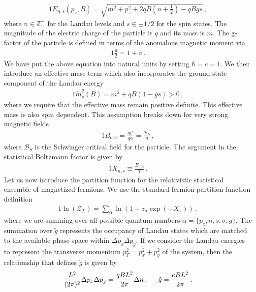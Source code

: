 \documentclass[
aps,
pra,
showpacs,
preprintnumbers,
amsmath,
amssymb,
footinbib
]{revtex4-2}
\begin{document}
\begin{alignat}{1}
    \label{EnergyKGP} E_{n,s}(p_{z},B) = \sqrt{m^{2}+p_{z}^{2}+2qB\left(n+\frac{1}{2}\right)-qBgs}\,,
\end{alignat}
where $n\in\mathbb{Z^{+}}$ for the Landau levels and $s\in\pm1/2$ for the spin states. The magnitude of the electric charge of the particle is $q$ and its mass is $m$. The g-factor of the particle is defined in terms of the anomalous magnetic moment via
\begin{alignat}{1}
    \label{gFactor} \frac{g}{2}=1+a\,.
\end{alignat}
We have put the above equation into natural units by setting $\hbar=c=1$. We then introduce an effective mass term which also incorporates the ground state component of the Landau energy
\begin{alignat}{1}
    \label{EffectiveMass} \tilde{m}^{2}_{s}(B)=m^{2}+qB(1-gs)>0\,,
\end{alignat}
where we require that the effective mass remain positive definite. This effective mass is also spin dependent. This assumption breaks down for very strong magnetic fields
\begin{alignat}{1}
    \label{BBreak} B_{\mathrm{crit}}=\frac{m^{2}}{qa}=\frac{\mathcal{B}_{S}}{a}\,,
\end{alignat}
where $\mathcal{B}_{S}$ is the Schwinger critical field for the particle. The argument in the statistical Boltzmann factor is given by
\begin{alignat}{1}
    \label{Boltz} X_{n,s}\equiv\frac{E_{n,s}}{T}\,.
\end{alignat}
Let us now introduce the partition function for the relativistic statistical ensemble of magnetized fermions. We use the standard fermion partition function definition
\begin{alignat}{1}
    \label{PartFunc} \ln\left(\mathcal{Z}_{L}\right)=\sum_{\alpha}\ln\left(1+z_{\sigma}\exp(-X_{s})\right)\,,
\end{alignat}
where we are summing over all possible quantum numbers $\alpha = \{p_{z},n,s,\sigma,\tilde{g}\}$. The summation over $\tilde{g}$ represents the occupancy of Landau states which are matched to the available phase space within $\Delta p_{x}\Delta p_{y}$. If we consider the Landau energies to represent the transverse momentum $p_{T}^{2}=p_{x}^{2}+p_{y}^{2}$ of the system, then the relationship that defines $\tilde{g}$ is given by
\begin{alignat}{1}
    \label{PhaseSpace} \frac{L^{2}}{(2\pi)^{2}}\Delta p_{x}\Delta p_{y}=\frac{qBL^{2}}{2\pi}\Delta n\,,\indent \tilde{g}=\frac{eBL^{2}}{2\pi}\,.
\end{alignat}
\end{document}
